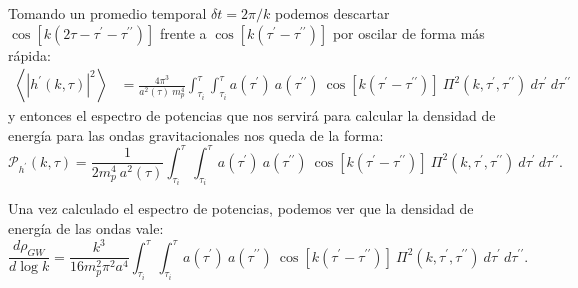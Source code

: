 Tomando un promedio temporal $\delta t = 2\pi / k$ podemos descartar $\cos \left[ k \left( 2 \tau - \tau^\prime - \tau^{\prime \prime} \right) \right]$ frente a $\cos \left[ k \left( \tau^{\prime} - \tau^{\prime \prime} \right) \right]$ por oscilar de forma más rápida:
\begin{equation*}
    \begin{split}
        \left\langle \left| h^\prime \left( k, \tau \right) \right|^2 \right\rangle &= \frac{4 \pi^3}{a^2 (\tau) ~ m_p^4} \int_{\tau_i}^{\tau} \int_{\tau_i}^\tau a \left( \tau^\prime \right) ~ a \left( \tau^{\prime \prime} \right) ~ \cos \left[ k \left( \tau^{\prime} - \tau^{\prime \prime} \right) \right] ~ \Pi^2 \left( k, \tau^\prime, \tau^{\prime \prime} \right) ~ d\tau^\prime ~ d\tau^{\prime \prime}
    \end{split}
\end{equation*}
y entonces el espectro de potencias que nos servirá para calcular la densidad de energía para las ondas gravitacionales nos queda de la forma:
\begin{equation}
    \mathcal{P}_{h^\prime} (k, \tau) = \frac{1}{2 m_p^4 ~ a^2 (\tau)} \int_{\tau_i}^{\tau} \int_{\tau_i}^\tau a \left( \tau^\prime \right) ~ a \left( \tau^{\prime \prime} \right) ~ \cos \left[ k \left( \tau^{\prime} - \tau^{\prime \prime} \right) \right] ~ \Pi^2 \left( k, \tau^\prime, \tau^{\prime \prime} \right) ~ d\tau^\prime ~ d\tau^{\prime \prime}.
\end{equation}

Una vez calculado el espectro de potencias, podemos ver que la densidad de energía de las ondas vale:
\begin{equation}
    \frac{d\rho_{GW}}{d \log k} = \frac{k^3}{16 m_p^2 \pi^2 a^4} \int_{\tau_i}^{\tau} \int_{\tau_i}^\tau a \left( \tau^\prime \right) ~ a \left( \tau^{\prime \prime} \right) ~ \cos \left[ k \left( \tau^{\prime} - \tau^{\prime \prime} \right) \right] ~ \Pi^2 \left( k, \tau^\prime, \tau^{\prime \prime} \right) ~ d\tau^\prime ~ d\tau^{\prime \prime}.
\end{equation}

